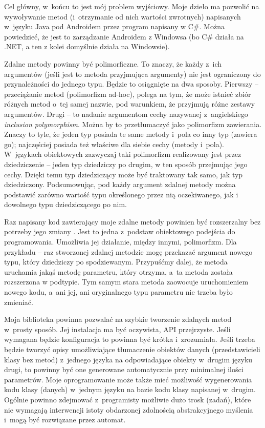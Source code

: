 \begin{description}
Cel główny, w~końcu to jest mój problem wyjściowy. Moje dzieło ma pozwolić na wywoływanie metod (i~otrzymanie od nich wartości zwrotnych) napisanych w~języku Java pod Androidem przez program napisany w C\#. Można powiedzieć, że jest to zarządzanie Androidem z Windowsa (bo C\# działa na .NET, a ten z kolei domyślnie działa na Windowsie).

Zdalne metody powinny być polimorficzne. To znaczy, że każdy z~ich argumentów (jeśli jest to metoda przyjmująca argumenty) nie jest ograniczony do przynależności do jednego typu\cite{polymorphism}. Będzie to osiągnięte na dwa sposoby. Pierwszy -- przeciążanie metod (polimorfizm ad-hoc), polega na tym, że może istnieć zbiór różnych metod o~tej samej nazwie, pod warunkiem, że przyjmują różne zestawy argumentów. Drugi -- to nadanie argumentom cechy nazywanej z~angielskiego \emph{inclusion polymorphism}. Można by to przetłumaczyć jako polimorfizm zawierania. Znaczy to tyle, że jeden typ posiada te same metody i~pola co inny typ (zawiera go); najczęściej posiada też właściwe dla siebie cechy (metody i~pola). W~językach obiektowych zazwyczaj taki polimorfizm realizowany jest przez dziedziczenie -- jeden typ dziedziczy po drugim, w ten sposób przejmując jego cechy. Dzięki temu typ dziedziczący może być traktowany tak samo, jak typ dziedziczony. Podsumowując, pod każdy argument zdalnej metody można podstawić zarówno wartość typu określonego przez nią oczekiwanego, jak i dowolnego typu dziedziczącego po nim.


Raz napisany kod zawierający moje zdalne metody powinien być rozszerzalny bez potrzeby jego zmiany \cite[str.~105]{designpatterns}. Jest to jedna z~podstaw obiektowego podejścia do programowania. Umożliwia jej działanie, między innymi, polimorfizm. Dla przykładu -- raz stworzonej zdalnej metodzie mogę przekazać argument nowego typu, który dziedziczy po spodziewanym. Przypuśćmy dalej, że metoda uruchamia jakąś metodę parametru, który otrzyma, a~ta metoda została rozszerzona w podtypie. Tym samym stara metoda zaowocuje uruchomieniem nowego kodu, a~ani jej, ani oryginalnego typu parametru nie trzeba było zmieniać.

Moja biblioteka powinna pozwalać na szybkie tworzenie zdalnych metod w~prosty sposób. Jej instalacja ma być oczywista, API przejrzyste. Jeśli wymagana będzie konfiguracja to powinna być krótka i~zrozumiała. Jeśli trzeba będzie tworzyć opisy umożliwiające tłumaczenie obiektów danych (przedstawicieli klasy bez metod) z~jednego języka na odpowiadające obiekty w~drugim języku drugi, to powinny być one generowane automatycznie przy minimalnej ilości parametrów. Moje oprogramowanie może także mieć możliwość wygenerowania kodu klasy (danych) w~jednym języku na bazie kodu klasy napisanej w~drugim. Ogólnie powinno zdejmować z~programisty możliwie dużo trosk (zadań), które nie wymagają interwencji istoty obdarzonej zdolnością abstrakcyjnego myślenia i~mogą być rozwiązane przez automat.


\end{description}
